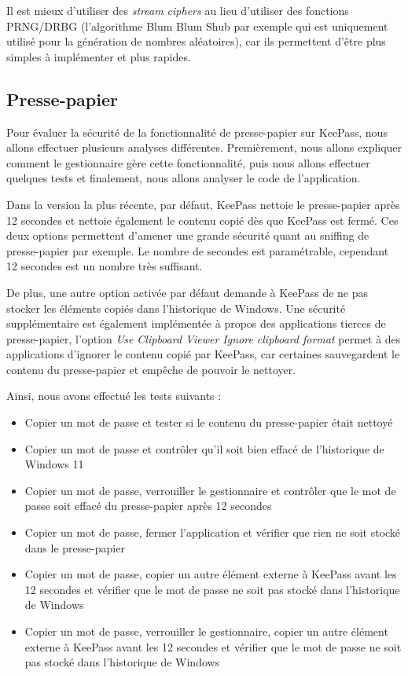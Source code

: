 Il est mieux d'utiliser des \textit{stream ciphers} au lieu d'utiliser des fonctions PRNG/DRBG (l'algorithme Blum Blum Shub par exemple qui est uniquement utilisé pour la génération de nombres aléatoires), car ils permettent d'être plus simples à implémenter et plus rapides. 

\subsection{Presse-papier}

Pour évaluer la sécurité de la fonctionnalité de presse-papier sur KeePass, nous allons effectuer plusieurs analyses différentes. Premièrement, nous allons expliquer comment le gestionnaire gère cette fonctionnalité, puis nous allons effectuer quelques tests et finalement, nous allons analyser le code de l'application. 

Dans la version la plus récente, par défaut, KeePass nettoie le presse-papier après 12 secondes et nettoie également le contenu copié dès que KeePass est fermé. Ces deux options permettent d'amener une grande sécurité quant au sniffing de presse-papier par exemple. Le nombre de secondes est paramétrable, cependant 12 secondes est un nombre très suffisant. 

De plus, une autre option activée par défaut demande à KeePass de ne pas stocker les éléments copiés dans l'historique de Windows. Une sécurité supplémentaire est également implémentée à propos des applications tierces de presse-papier, l'option \textit{Use Clipboard Viewer Ignore clipboard format} permet à des applications d'ignorer le contenu copié par KeePass, car certaines sauvegardent le contenu du presse-papier et empêche de pouvoir le nettoyer. 

Ainsi, nous avons effectué les tests suivants :
\begin{itemize}
	\item[\checkmark] Copier un mot de passe et tester si le contenu du presse-papier était nettoyé
	\item[\checkmark] Copier un mot de passe et contrôler qu'il soit bien effacé de l'historique de Windows 11
	\item[\checkmark] Copier un mot de passe, verrouiller le gestionnaire et contrôler que le mot de passe soit effacé du presse-papier après 12 secondes
	\item[\checkmark] Copier un mot de passe, fermer l'application et vérifier que rien ne soit stocké dans le presse-papier
	\item[\checkmark] Copier un mot de passe, copier un autre élément externe à KeePass avant les 12 secondes et vérifier que le mot de passe ne soit pas stocké dans l'historique de Windows
	\item[\checkmark] Copier un mot de passe, verrouiller le gestionnaire, copier un autre élément externe à KeePass avant les 12 secondes et vérifier que le mot de passe ne soit pas stocké dans l'historique de Windows
\end{itemize}

